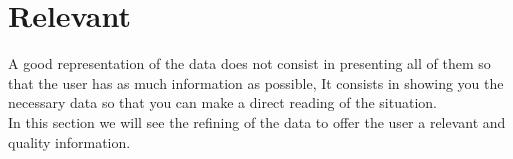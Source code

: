 \newpage
\section{Relevant}
 

A good representation of the data does not consist in presenting all of them so that the user has as much information as possible,
It consists in showing you the necessary data so that you can make a direct reading of the situation.\\

In this section we will see the refining of the data to offer the user a relevant and quality information.






